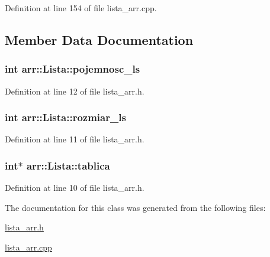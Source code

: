 Definition at line 154 of file lista\-\_\-arr.\-cpp.



\subsection{Member Data Documentation}
\hypertarget{classarr_1_1_lista_a46550171712501ae7301b95b5c35d14c}{
\subsubsection[{pojemnosc\-\_\-ls}]{\setlength{\rightskip}{0pt plus 5cm}int arr\-::\-Lista\-::pojemnosc\-\_\-ls\hspace{0.3cm}{\ttfamily [private]}}}\label{classarr_1_1_lista_a46550171712501ae7301b95b5c35d14c}


Definition at line 12 of file lista\-\_\-arr.\-h.

\hypertarget{classarr_1_1_lista_a5d6712accdb4a0eda72038aadbfe1cd6}{
\subsubsection[{rozmiar\-\_\-ls}]{\setlength{\rightskip}{0pt plus 5cm}int arr\-::\-Lista\-::rozmiar\-\_\-ls\hspace{0.3cm}{\ttfamily [private]}}}\label{classarr_1_1_lista_a5d6712accdb4a0eda72038aadbfe1cd6}


Definition at line 11 of file lista\-\_\-arr.\-h.

\hypertarget{classarr_1_1_lista_aba76002ee48a3dc21187f0bf9da1a746}{
\subsubsection[{tablica}]{\setlength{\rightskip}{0pt plus 5cm}int$\ast$ arr\-::\-Lista\-::tablica\hspace{0.3cm}{\ttfamily [private]}}}\label{classarr_1_1_lista_aba76002ee48a3dc21187f0bf9da1a746}


Definition at line 10 of file lista\-\_\-arr.\-h.



The documentation for this class was generated from the following files\-:\begin{DoxyCompactItemize}
\item 
\hyperlink{lista__arr_8h}{lista\-\_\-arr.\-h}\item 
\hyperlink{lista__arr_8cpp}{lista\-\_\-arr.\-cpp}\end{DoxyCompactItemize}
